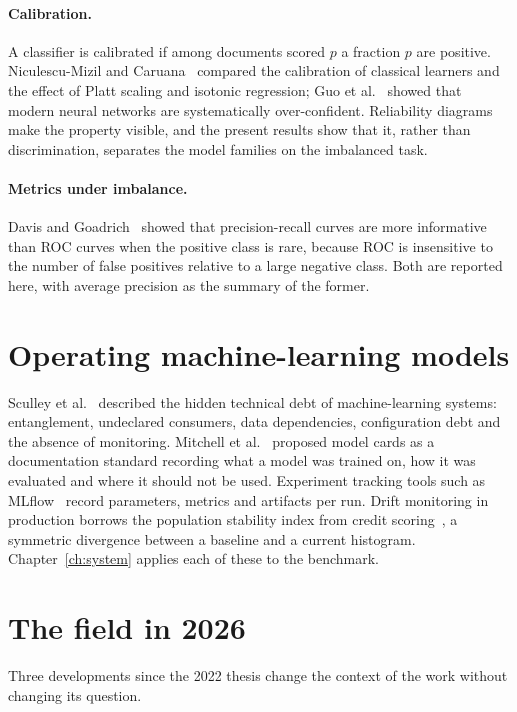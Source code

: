 \paragraph{Calibration.} A classifier is calibrated if among documents scored $p$ a fraction $p$ are positive. Niculescu-Mizil and Caruana~\cite{niculescu2005} compared the calibration of classical learners and the effect of Platt scaling and isotonic regression; Guo et al.~\cite{guo2017} showed that modern neural networks are systematically over-confident. Reliability diagrams make the property visible, and the present results show that it, rather than discrimination, separates the model families on the imbalanced task.

\paragraph{Metrics under imbalance.} Davis and Goadrich~\cite{davis2006} showed that precision-recall curves are more informative than ROC curves when the positive class is rare, because ROC is insensitive to the number of false positives relative to a large negative class. Both are reported here, with average precision as the summary of the former.

\section{Operating machine-learning models}
Sculley et al.~\cite{sculley2015} described the hidden technical debt of machine-learning systems: entanglement, undeclared consumers, data dependencies, configuration debt and the absence of monitoring. Mitchell et al.~\cite{mitchell2019} proposed model cards as a documentation standard recording what a model was trained on, how it was evaluated and where it should not be used. Experiment tracking tools such as MLflow~\cite{zaharia2018} record parameters, metrics and artifacts per run. Drift monitoring in production borrows the population stability index from credit scoring~\cite{siddiqi2006}, a symmetric divergence between a baseline and a current histogram. Chapter~\ref{ch:system} applies each of these to the benchmark.

\section{The field in 2026}
\label{sec:bg2026}
Three developments since the 2022 thesis change the context of the work without changing its question.

